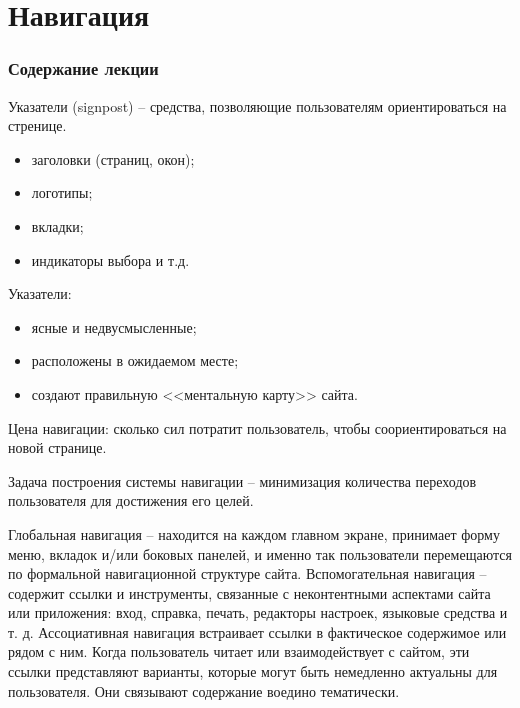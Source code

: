 \documentclass{beamer}
\begin{document}
\section{Навигация}

\begin{frame}
  \frametitle{Содержание лекции}
  \tableofcontents[current]
\end{frame}

\begin{frame}[t]
	Указатели (signpost) -- средства, позволяющие пользователям ориентироваться на стренице.
	\begin{itemize}
		\item заголовки (страниц, окон);
		\item логотипы;
		\item вкладки;
		\item индикаторы выбора и т.д.						
	\end{itemize}
	
	Указатели:
	\begin{itemize}
		\item ясные и недвусмысленные;
		\item расположены в ожидаемом месте;
		\item создают правильную <<ментальную карту>> сайта.
	\end{itemize}
	
	Цена навигации: сколько сил потратит пользователь, чтобы соориентироваться на новой странице.
	
	Задача построения системы навигации -- минимизация количества переходов пользователя для достижения его целей.
\end{frame} 

\begin{frame}[t]
	Глобальная навигация -- находится на каждом главном экране, принимает форму
меню, вкладок и/или боковых панелей, и именно так пользователи перемещаются по формальной навигационной структуре сайта. 
	Вспомогательная навигация --  содержит ссылки и инструменты, связанные с
неконтентными аспектами сайта или приложения: вход, справка, печать, редакторы настроек, языковые средства и т. д.
	Ассоциативная навигация встраивает ссылки в фактическое содержимое или рядом с ним. Когда пользователь читает или взаимодействует с сайтом, эти ссылки представляют варианты, которые могут быть немедленно актуальны для пользователя. Они связывают содержание воедино тематически.
\end{frame} 
\end{document}
